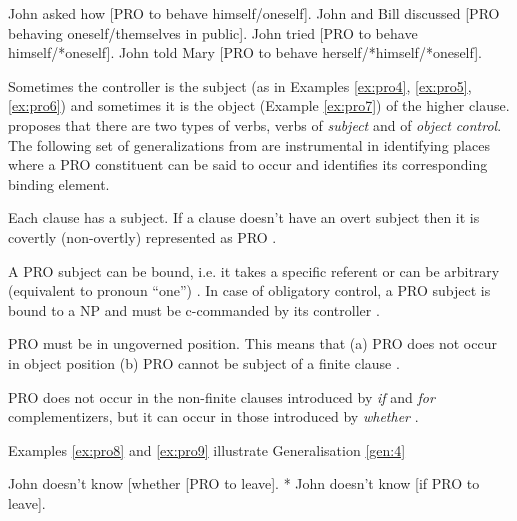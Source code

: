 \begin{exe}
	\ex\label{ex:pro4}John asked how [PRO to behave himself/oneself].
	\ex\label{ex:pro5}John and Bill discussed [PRO behaving oneself/themselves in public].
	\ex\label{ex:pro6}John tried [PRO to behave himself/*oneself].
	\ex\label{ex:pro7}John told Mary [PRO to behave herself/*himself/*oneself].
\end{exe}

Sometimes the controller is the subject (as in Examples \ref{ex:pro4}, \ref{ex:pro5}, \ref{ex:pro6}) and sometimes it is the object (Example \ref{ex:pro7}) of the higher clause. \citet[278]{Haegeman1991} proposes that there are two types of verbs, verbs of \textit{subject} and of \textit{object control}. The following set of generalizations from \cite{Haegeman1991} are instrumental in identifying places where a PRO constituent can be said to occur and identifies its corresponding binding element.

\begin{generalization}\label{gen:1}
	Each clause has a subject. If a clause doesn't have an overt subject then it is covertly (non-overtly) represented as PRO
     \citep[263]{Haegeman1991}.
\end{generalization}
\begin{generalization}\label{gen:2}
	A PRO subject can be bound, i.e. it takes a specific referent or can be arbitrary (equivalent to pronoun ``one'') \citep[263]{Haegeman1991}. In case of obligatory control, a PRO subject is bound to a NP and must be c-commanded by its controller \citep[278]{Haegeman1991}.
\end{generalization}

\begin{generalization}\label{gen:3}
	PRO must be in ungoverned position. This means that (a) PRO does not occur in object position (b) PRO cannot be subject of a finite clause \citep[279]{Haegeman1991}. 
\end{generalization}
\begin{generalization}\label{gen:4}
	PRO does not occur in the non-finite clauses introduced by \textit{if} and \textit{for} complementizers, but it can occur in those introduced by \textit{whether} \citep[279]{Haegeman1991}.  
\end{generalization}
Examples \ref{ex:pro8} and \ref{ex:pro9} illustrate Generalisation \ref{gen:4}
\begin{exe}
	\ex\label{ex:pro8} John doesn't know [whether [PRO to leave].
	\ex\label{ex:pro9} * John doesn’t know [if PRO to leave].
\end{exe}

